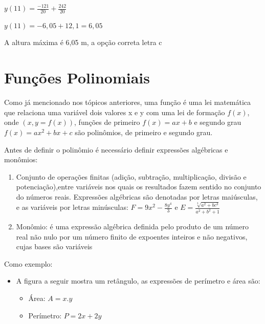 \begin{multicols*}{2}
            $y(11) = \frac{-121}{20} + \frac{242}{20} $
            
            $y(11) = -6,05 + 12,1  = 6,05 $
            
            A altura máxima é 6,05 m, a opção correta letra c
            
            
            \section*{Funções Polinomiais}
            Como já mencionado nos tópicos anteriores, uma função é uma lei matemática que relaciona uma 			variável dois valores x e y com uma lei de formação $f(x)$, onde $(x, y = f(x))$, funções de 			primeiro $f(x) = ax + b$ e segundo grau $f(x) = ax^2 + bx + c$ são polinômios, de primeiro e 			segundo grau.
            
            Antes de definir o polinômio é necessário definir expressões algébricas e monômios:
            \begin{enumerate}
            \item Conjunto de operações finitas (adição, subtração, multiplicação, divisão e 						potenciação),entre variáveis nos quais os resultados fazem sentido no conjunto do números 				reais. Expressões algébricas são denotadas por letras maiúsculas, e as variáveis por letras 			minúsculas: $F = 9x^2 - \frac{8 y^4}{3}$ e $E = \frac{ \sqrt[3]{a^2 + bc^3}}{a^2 + b^2 +1 }$
            
            
            \item Monômio: é uma expressão algébrica definida pelo produto de um número real não nulo por 			um número finito de expoentes inteiros e não negativos, cujas bases são variáveis
            \end{enumerate}
            
            Como exemplo:
            \begin{itemize}
            \item A figura a seguir mostra um retângulo, as expressões de perímetro e área são:
            \begin{itemize}
                \item Área: $A = x.y$
                \item Perímetro: $ P  = 2x + 2y$
            \end{itemize}
            
    
    

\end{itemize}
\end{multicols*}
